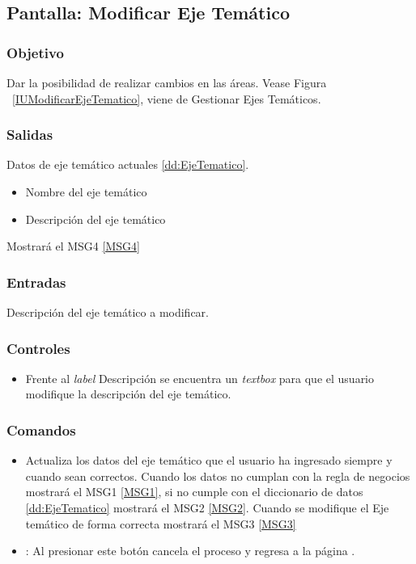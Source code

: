 \subsection{Pantalla: Modificar Eje Temático}

\subsubsection{Objetivo}
Dar la posibilidad de realizar cambios en las áreas. Vease Figura ~\ref{IUModificarEjeTematico}, viene de Gestionar Ejes Temáticos.


\subsubsection{Salidas}
Datos de eje temático actuales \ref{dd:EjeTematico}.
\begin{itemize}
\item Nombre del eje temático
\item Descripción del eje temático
\end{itemize}
Mostrará el MSG4 \ref{MSG4}

\subsubsection{Entradas}
Descripción del eje temático a modificar.
\subsubsection{Controles}
\begin{itemize}
\item Frente al \textit{label} Descripción se encuentra un \textit{textbox} para que el usuario modifique la descripción del eje temático.
\end{itemize}
\subsubsection{Comandos}
\begin{itemize}
 \item {} Actualiza los datos del eje temático que el usuario ha ingresado siempre y cuando sean correctos. Cuando los datos no cumplan con la regla de negocios   mostrará el MSG1 \ref{MSG1}, si no cumple con el diccionario de datos \ref{dd:EjeTematico} mostrará el MSG2 \ref{MSG2}. Cuando se modifique el Eje temático de forma correcta mostrará el MSG3 \ref{MSG3} 
 \item {}: Al presionar este botón cancela el proceso y regresa a la página .

\end{itemize}


